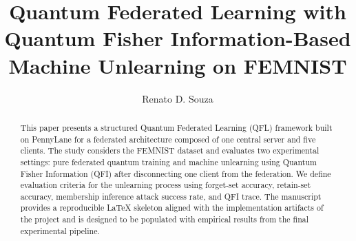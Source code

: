 \documentclass[11pt,a4paper]{article}
\title{Quantum Federated Learning with Quantum Fisher Information-Based Machine Unlearning on FEMNIST}
\author{Renato D. Souza}
\date{}
\begin{document}
\maketitle

\begin{abstract}
This paper presents a structured Quantum Federated Learning (QFL) framework built on PennyLane for a federated architecture composed of one central server and five clients. The study considers the FEMNIST dataset and evaluates two experimental settings: pure federated quantum training and machine unlearning using Quantum Fisher Information (QFI) after disconnecting one client from the federation. We define evaluation criteria for the unlearning process using forget-set accuracy, retain-set accuracy, membership inference attack success rate, and QFI trace. The manuscript provides a reproducible LaTeX skeleton aligned with the implementation artifacts of the project and is designed to be populated with empirical results from the final experimental pipeline.
\end{abstract}











\end{document}
